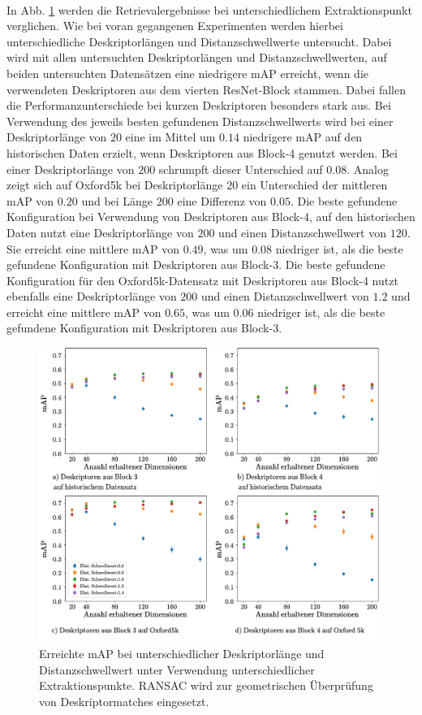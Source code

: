 \\
In Abb. \ref{mAP_layer_diff_ransac} werden die Retrievalergebnisse bei unterschiedlichem Extraktionspunkt verglichen. Wie bei voran gegangenen Experimenten werden hierbei unterschiedliche Deskriptorlängen und Distanzschwellwerte untersucht. Dabei wird mit allen untersuchten Deskriptorlängen und Distanzschwellwerten, auf beiden untersuchten Datensätzen eine niedrigere mAP erreicht, wenn die verwendeten Deskriptoren aus dem vierten ResNet-Block stammen. Dabei fallen die Performanzunterschiede bei kurzen Deskriptoren besonders stark aus. Bei Verwendung des jeweils besten gefundenen Distanzschwellwerts wird bei einer Deskriptorlänge von $20$ eine im Mittel um $0.14$ niedrigere mAP auf den historischen Daten erzielt, wenn Deskriptoren aus Block-4 genutzt werden. Bei einer Deskriptorlänge von $200$ schrumpft dieser Unterschied auf $0.08$. Analog zeigt sich auf Oxford5k bei Deskriptorlänge $20$ ein Unterschied der mittleren mAP von $0.20$ und bei Länge $200$ eine Differenz von $0.05$. Die beste gefundene Konfiguration bei Verwendung von Deskriptoren aus Block-4, auf den historischen Daten nutzt eine Deskriptorlänge von $200$ und einen Distanzschwellwert von $120$. Sie erreicht eine mittlere mAP von $0.49$, was um $0.08$ niedriger ist, als die beste gefundene Konfiguration mit Deskriptoren aus Block-3. Die beste gefundene Konfiguration für den Oxford5k-Datensatz mit Deskriptoren aus Block-4 nutzt ebenfalls eine Deskriptorlänge von $200$ und einen Distanzschwellwert von $1.2$ und erreicht eine mittlere mAP von $0.65$, was um $0.06$ niedriger ist, als die beste gefundene Konfiguration mit Deskriptoren aus Block-3.
\\
\begin{figure}[h]
\includegraphics[scale=0.73]{mAP_layer_diff_ransac}
\caption{Erreichte mAP bei unterschiedlicher Deskriptorlänge und Distanzschwellwert unter Verwendung unterschiedlicher Extraktionspunkte.
RANSAC wird zur geometrischen Überprüfung von Deskriptormatches eingesetzt.}
\label{mAP_layer_diff_ransac}
\end{figure}
